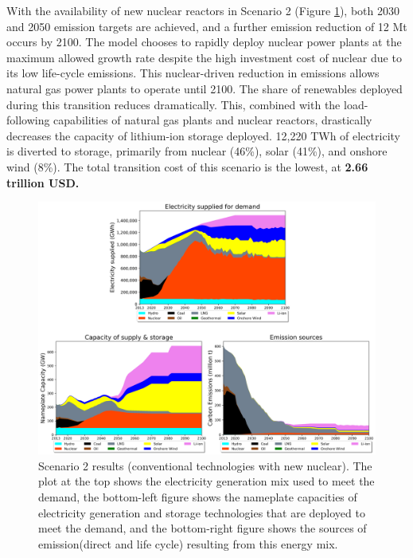 With the availability of new nuclear reactors in Scenario 2 (Figure \ref{scen2}), both 2030 and 2050 emission targets are achieved, and a further emission reduction of 12 Mt occurs by 2100. The model chooses to rapidly deploy nuclear power plants at the maximum allowed growth rate despite the high investment cost of nuclear due to its low life-cycle emissions. This nuclear-driven reduction in emissions allows natural gas power plants to operate until 2100. The share of renewables deployed during this transition reduces dramatically. This, combined with the load-following capabilities of natural gas plants and nuclear reactors, drastically decreases the capacity of lithium-ion storage deployed. 12,220 TWh of electricity is diverted to storage, primarily from nuclear (46\%), solar (41\%), and onshore wind (8\%). The total transition cost of this scenario is the lowest, at \textbf{2.66 trillion USD.}

\begin{figure}[H] 
\centering
\includegraphics[scale=0.5]{figures/conv_nuc}
\caption{Scenario 2 results (conventional technologies with new nuclear). The plot at the top shows the electricity generation mix used to meet the demand, the bottom-left figure shows the nameplate capacities of electricity generation and storage technologies that are deployed to meet the demand, and the bottom-right figure shows the sources of emission(direct and life cycle) resulting from this energy mix.}
\label{scen2}
\end{figure}

